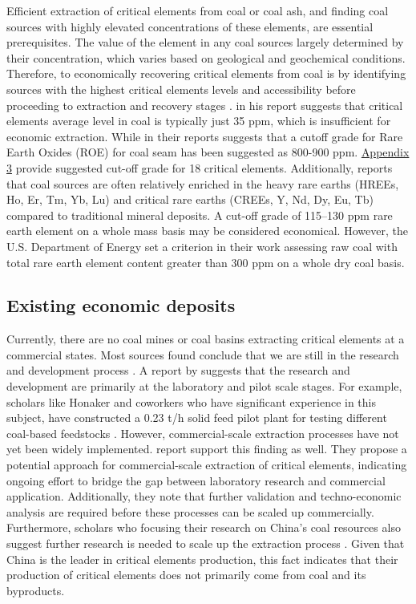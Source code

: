 \documentclass[11pt,a4paper,]{article}
\begin{document}
Efficient extraction of critical elements from coal or coal ash, and finding coal sources with highly elevated concentrations of these elements, are essential prerequisites. The value of the element in any coal sources largely determined by their concentration, which varies based on geological and geochemical conditions. Therefore, to economically recovering critical elements from coal is by identifying sources with the highest critical elements levels and accessibility before proceeding to extraction and recovery stages \autocite{Eterigho2021}. \textcite{Reid2018} in his report suggests that critical elements average level in coal is typically just 35 ppm, which is insufficient for economic extraction. While \textcite{Seredin2012} in their reports suggests that a cutoff grade for Rare Earth Oxides (ROE) for coal seam has been suggested as 800-900 ppm. \hyperref[sec-appendixthree]{Appendix 3} provide suggested cut-off grade for 18 critical elements. Additionally, \textcite{TALAN2022107897} reports that coal sources are often relatively enriched in the heavy rare earths (HREEs, Ho, Er, Tm, Yb, Lu) and critical rare earths (CREEs, Y, Nd, Dy, Eu, Tb) compared to traditional mineral deposits. A cut-off grade of 115--130 ppm rare earth element on a whole mass basis may be considered economical. However, the U.S. Department of Energy set a criterion in their work assessing raw coal with total rare earth element content greater than 300 ppm on a whole dry coal basis.

\subsection{Existing economic deposits}\label{existing-economic-deposits}

Currently, there are no coal mines or coal basins extracting critical elements at a commercial states. Most sources found conclude that we are still in the research and development process \autocite{Hodgkinson2020,DAI2018155,Eterigho2021,osti_1808639,TALAN2022107897}. A report by \textcite{Eterigho2021} suggests that the research and development are primarily at the laboratory and pilot scale stages. For example, scholars like Honaker and coworkers who have significant experience in this subject, have constructed a 0.23 t/h solid feed pilot plant for testing different coal-based feedstocks \autocite{osti_1808639}. However, commercial-scale extraction processes have not yet been widely implemented. \textcite{TALAN2022107897} report support this finding as well. They propose a potential approach for commercial-scale extraction of critical elements, indicating ongoing effort to bridge the gap between laboratory research and commercial application. Additionally, they note that further validation and techno-economic analysis are required before these processes can be scaled up commercially. Furthermore, scholars who focusing their research on China's coal resources also suggest further research is needed to scale up the extraction process \autocite{Qin2015,Qin2015b,Liu2024,Zhao2019,ZOU2023105245}. Given that China is the leader in critical elements production, this fact indicates that their production of critical elements does not primarily come from coal and its byproducts.
\end{document}
